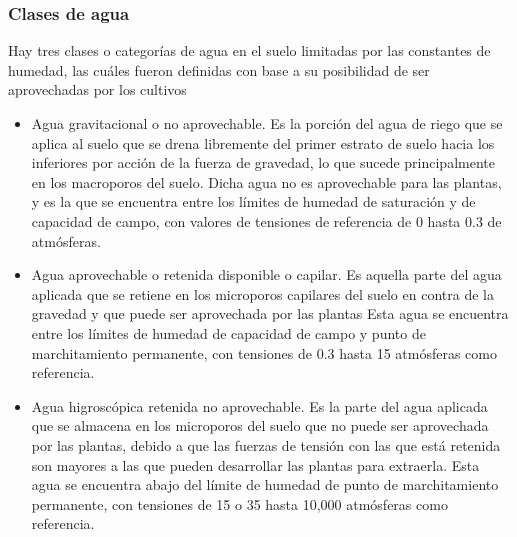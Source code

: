 \subsubsection{Clases de agua}
Hay tres clases o categorías de agua en el suelo limitadas por las constantes de humedad, las cuáles fueron definidas con base a su posibilidad de ser aprovechadas por los cultivos
\begin{itemize} 
\item Agua gravitacional o no aprovechable. Es la porción del agua de riego que se aplica al suelo que se drena libremente del primer estrato de suelo hacia los inferiores por acción de la fuerza de gravedad, lo que sucede principalmente en los macroporos del suelo. Dicha agua no es aprovechable para las plantas, y es la que se encuentra entre los límites de humedad de saturación y de capacidad de campo, con valores de tensiones de referencia de 0 hasta 0.3 de atmósferas.
\item Agua aprovechable o retenida disponible o capilar. Es aquella parte del agua aplicada que se retiene en los microporos capilares del suelo en contra de la gravedad y que puede ser aprovechada por las plantas Esta agua se encuentra entre los límites de humedad de capacidad de campo y punto de marchitamiento permanente, con tensiones de 0.3 hasta 15 atmósferas como referencia.
\item Agua higroscópica retenida no aprovechable. Es la parte del agua aplicada que se almacena en los microporos del suelo que no puede ser aprovechada por las plantas, debido a que las fuerzas de tensión con las que está retenida son mayores a las que pueden desarrollar las plantas para extraerla. Esta agua se encuentra abajo del límite de humedad de punto de marchitamiento permanente, con tensiones de 15 o 35 hasta 10,000 atmósferas como referencia.
\end{itemize}

